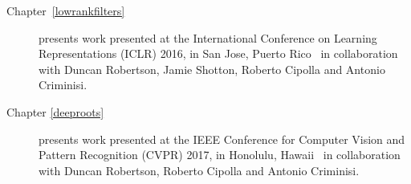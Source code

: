 \begin{acknowledgements}
\begin{description}
	\item[Chapter~\ref{lowrankfilters}] presents work presented at the International Conference on Learning Representations (ICLR) 2016, in San Jose, Puerto Rico~\cite{Ioannou2016} in collaboration with Duncan Robertson, Jamie Shotton, Roberto Cipolla and Antonio Criminisi.

	\item[Chapter \ref{deeproots}] presents work presented at the IEEE Conference for Computer Vision and Pattern Recognition (CVPR) 2017, in Honolulu, Hawaii~\cite{ioannou2016e} in collaboration with Duncan Robertson, Roberto Cipolla and Antonio Criminisi.
\end{description}


\end{acknowledgements}
